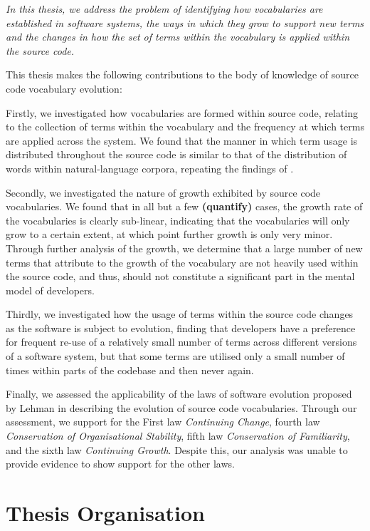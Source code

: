 \emph{In this thesis, we address the problem of identifying how vocabularies are established in software systems, the ways in which they grow to support new terms and the changes in how the set of terms within the vocabulary is applied within the source code.}

This thesis makes the following contributions to the body of knowledge of source code vocabulary evolution:

Firstly, we investigated how vocabularies are formed within source code, relating to the collection of terms within the vocabulary and the frequency at which terms are applied across the system. We found that the manner in which term usage is distributed throughout the source code is similar to that of the distribution of words within natural-language corpora, repeating the findings of \cite{Pierret09a}.

Secondly, we investigated the nature of growth exhibited by source code vocabularies. We found that in all but a few \textbf{(quantify)} cases, the growth rate of the vocabularies is clearly sub-linear, indicating that the vocabularies will only grow to a certain extent, at which point further growth is only very minor. Through further analysis of the growth, we determine that a large number of new terms that attribute to the growth of the vocabulary are not heavily used within the source code, and thus, should not constitute a significant part in the mental model of developers.

Thirdly, we investigated how the usage of terms within the source code changes as the software is subject to evolution, finding that developers have a preference for frequent re-use of a relatively small number of terms across different versions of a software system, but that some terms are utilised only a small number of times within parts of the codebase and then never again.

Finally, we assessed the applicability of the laws of software evolution proposed by Lehman \cite{Lehman80a,Lehman97a} in describing the evolution of source code vocabularies. Through our assessment, we support for the First law \emph{Continuing Change}, fourth law \emph{Conservation of Organisational Stability}, fifth law \emph{Conservation of Familiarity}, and the sixth law \emph{Continuing Growth}. Despite this, our analysis was unable to provide evidence to show support for the other laws.


\section{Thesis Organisation} %
\label{sec:thesis_organisation}

